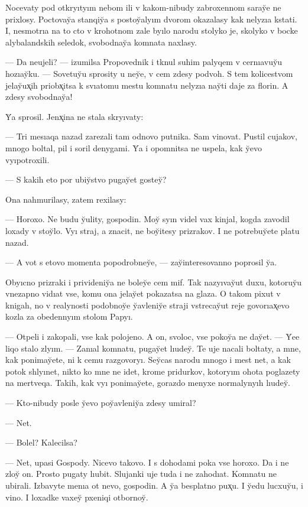 \documentclass[10pt]{book}
\begin{document}
Nocevaty pod otkryıtyım nebom ili v kakom-nibudy zabroxennom saray̆e ne prixlosy. Poctovay̆a stanqiy̆a s postoy̆alyım dvorom okazalasy kak nelyzıa kstati. I, nesmotrıa na to cto v krohotnom zale byılo narodu stolyko je, skolyko v bocke alybalandskih seledok, svobodnay̆a komnata naxlasy.

— Da neujeli? — izumilsa Propovednik i tknul suhim palyqem v cernıavuy̆u hozıay̆ku. — Sovetuy̆u sprosity u ney̆e, v cem zdesy podvoh. S tem kolicestvom jelay̆ux̨ih priobx̨itsa k svıatomu mestu komnatu nelyzıa nay̆ti daje za florin. A zdesy svobodnay̆a!

Y̆a sprosil. Jenx̨ina ne stala skryıvaty:

— Tri mesıaqa nazad zarezali tam odnovo putnika. Sam vinovat. Pustil cujakov, mnogo boltal, pil i soril denygami. Y̆a i opomnitsa ne uspela, kak y̆evo vyıpotroxili.

— S kakih eto por ubiy̆stvo pugay̆et gostey̆?

Ona nahmurilasy, zatem rexilasy:

— Horoxo. Ne budu y̆ulity, gospodin. Moy̆ syın videl vax kinjal, kogda zavodil loxady v stoy̆lo. Vyı straj, a znacit, ne boy̆itesy prizrakov. I ne potrebuy̆ete platu nazad.

— A vot s etovo momenta popodrobney̆e, — zay̆interesovanno poprosil y̆a.

Obyıcno prizraki i privideniy̆a ne boley̆e cem mif. Tak nazyıvay̆ut duxu, kotoruy̆u vnezapno vidıat vse, komu ona jelay̆et pokazatsa na glaza. O takom pixut v knigah, no v realynosti podobnoy̆e y̆avleniy̆e straji vstrecay̆ut reje govorıax̨evo kozla za obedennyım stolom Papyı.

— Otpeli i zakopali, vse kak polojeno. A on, svoloc, vse pokoy̆a ne day̆et. — Y̆ee liqo stalo zlyım. — Zanıal komnatu, pugay̆et lıudey̆. Te uje nacali boltaty, a mne, kak ponimay̆ete, ni k cemu razgovoryı. Sey̆cas narodu mnogo i mest net, a kak potok shlyınet, nikto ko mne ne idet, krome pridurkov, kotoryım ohota poglazety na mertveqa. Takih, kak vyı ponimay̆ete, gorazdo menyxe normalynyıh lıudey̆.

— Kto-nibudy posle y̆evo poy̆avleniy̆a zdesy umiral?

— Net.

— Bolel? Kalecilsa?

— Net, upasi Gospody. Nicevo takovo. I s dohodami poka vse horoxo. Da i ne zloy̆ on. Prosto pugaty lıubit. Slujanki uje tuda i ne zahodıat. Komnatu ne ubirali. Izbavyte menıa ot nevo, gospodin. A y̆a besplatno pux̨u. I y̆edu lucxuy̆u, i vino. I loxadke vaxey̆ pxeniqi otbornoy̆.
\end{document}
